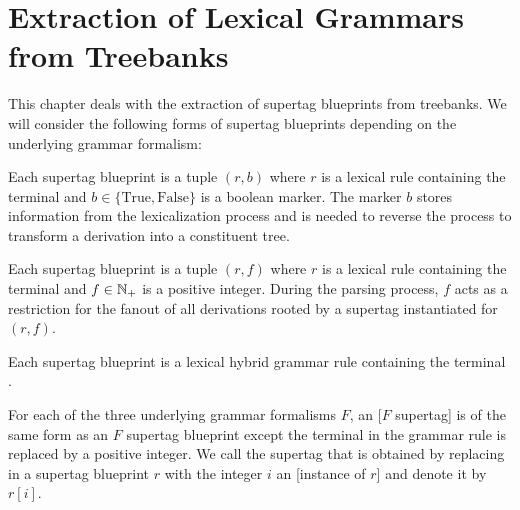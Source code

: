\documentclass[../document.tex]{subfiles}
\begin{document}
    \chapter{Extraction of Lexical Grammars from Treebanks}\label{sec:extraction}
    This chapter deals with the extraction of supertag blueprints from treebanks.
    We will consider the following forms of supertag blueprints depending on the underlying grammar formalism:
    \begin{compactenum}
        \item
            Each  supertag blueprint is a tuple \((r, b)\) where \(r\) is a lexical  rule containing the terminal \wildcard{} and \(b \in \{\text{True}, \text{False}\}\) is a boolean marker.
            The marker \(b\) stores information from the lexicalization process and is needed to reverse the process to transform a derivation into a constituent tree.
        \item
            Each  supertag blueprint is a tuple \((r, f)\) where \(r\) is a lexical  rule containing the terminal \wildcard{} and \(f \in \mathbb{N}_+\) is a positive integer.
            During the parsing process, \(f\) acts as a restriction for the fanout of all derivations rooted by a supertag instantiated for \((r,f)\).
        \item Each  supertag blueprint is a lexical hybrid grammar rule containing the terminal \wildcard{}.
    \end{compactenum}
    For each of the three underlying grammar formalisms \(F\), an [\(F\) supertag] is of the same form as an \(F\) supertag blueprint except the terminal \wildcard{} in the grammar rule is replaced by a positive integer.
    We call the supertag that is obtained by replacing \wildcard{} in a supertag blueprint \(r\) with the integer \(i\) an [instance of \(r\)] and denote it by \(r[i]\).
\end{document}
